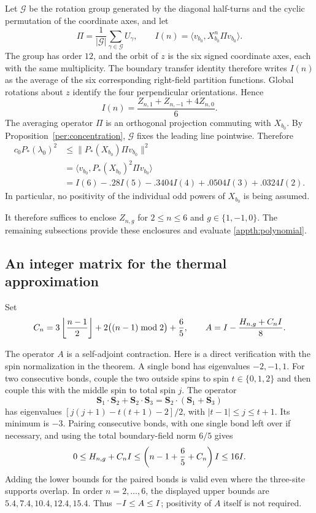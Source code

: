 Let $\mathcal G$ be the rotation group generated by the diagonal half-turns and the
cyclic permutation of the coordinate axes, and let
\[
 \Pi=\frac1{|\mathcal G|}\sum_{\gamma\in\mathcal G}U_\gamma,
 \qquad I(n)=\langle v_{b_0},X_{b_0}^n\Pi v_{b_0}\rangle.
\]
The group has order $12$, and the orbit of $z$ is the six signed coordinate
axes, each with the same multiplicity. The boundary transfer identity
therefore writes $I(n)$ as the average of the six corresponding right-field
partition functions. Global rotations about $z$ identify the four
perpendicular orientations. Hence
\begin{equation}\label{appth:average}
 I(n)=\frac{Z_{n,1}+Z_{n,-1}+4Z_{n,0}}6.
\end{equation}
The averaging operator $\Pi$ is an orthogonal projection commuting with
$X_{b_0}$. By Proposition~\ref{per:concentration}, $\mathcal G$ fixes the
leading line pointwise. Therefore
\begin{align}
 c_0P_*(\lambda_0)^2
 &\le\|P_*(X_{b_0})\Pi v_{b_0}\|^2\nonumber\\
 &=\langle v_{b_0},P_*(X_{b_0})^2\Pi v_{b_0}\rangle\nonumber\\
 &=I(6)-.28I(5)-.3404I(4)+.0504I(3)+.0324I(2).
 \label{appth:polynomial}
\end{align}
In particular, no positivity of the individual odd powers of $X_{b_0}$
is being assumed.

It therefore suffices to enclose $Z_{n,g}$ for $2\le n\le6$ and
$g\in\{1,-1,0\}$. The remaining subsections provide these enclosures
and evaluate \eqref{appth:polynomial}.

\subsection{An integer matrix for the thermal approximation}

Set
\begin{equation}\label{appth:C}
 C_n=3\left\lfloor\frac{n-1}{2}\right\rfloor
          +2\bigl((n-1)\bmod2\bigr)+\frac65,
 \qquad A=I-\frac{H_{n,g}+C_nI}{8}.
\end{equation}

The operator $A$ is a self-adjoint contraction. Here is a direct verification
with the spin normalization in the theorem. A single bond has eigenvalues
$-2,-1,1$. For two consecutive bonds, couple the two outside spins to spin
$t\in\{0,1,2\}$ and then couple this with the middle spin to total spin $j$.
The operator
\[
 \mathbf S_1\mathbin\cdot\mathbf S_2+
 \mathbf S_2\mathbin\cdot\mathbf S_3
   =\mathbf S_2\mathbin\cdot(\mathbf S_1+\mathbf S_3)
\]
has eigenvalues $[j(j+1)-t(t+1)-2]/2$, with
$|t-1|\le j\le t+1$. Its minimum is $-3$.
Pairing consecutive bonds, with one single bond left over if necessary,
and using the total boundary-field norm $6/5$ gives
\[
 0\le H_{n,g}+C_nI
    \le\left(n-1+\frac65+C_n\right)I\le16I.
\]
Adding the lower bounds for the paired bonds is valid even where the
three-site supports overlap. In order $n=2,\ldots,6$, the displayed upper
bounds are $5.4,7.4,10.4,12.4,15.4$. Thus $-I\le A\le I$;
positivity of $A$ itself is not required.


